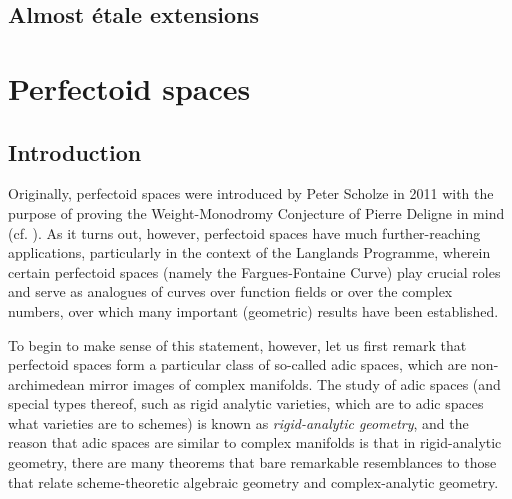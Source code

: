             \begin{definition} \label{def: almost_flatness}
            
            \end{definition}
            
        \subsection{Almost \'etale extensions}
    
    \section{Perfectoid spaces}
        \subsection{Introduction}
            Originally, perfectoid spaces were introduced by Peter Scholze in 2011 with the purpose of proving the Weight-Monodromy Conjecture of Pierre Deligne in mind (cf. \cite{scholze2011perfectoid}). As it turns out, however, perfectoid spaces have much further-reaching applications, particularly in the context of the Langlands Programme, wherein certain perfectoid spaces (namely the Fargues-Fontaine Curve) play crucial roles and serve as analogues of curves over function fields or over the complex numbers, over which many important (geometric) results have been established. 
    	    
    	    To begin to make sense of this statement, however, let us first remark that perfectoid spaces form a particular class of so-called adic spaces, which are non-archimedean mirror images of complex manifolds. The study of adic spaces (and special types thereof, such as rigid analytic varieties, which are to adic spaces what varieties are to schemes) is known as \textit{rigid-analytic geometry}, and the reason that adic spaces are similar to complex manifolds is that in rigid-analytic geometry, there are many theorems that bare remarkable resemblances to those that relate scheme-theoretic algebraic geometry and complex-analytic geometry.
    	    
